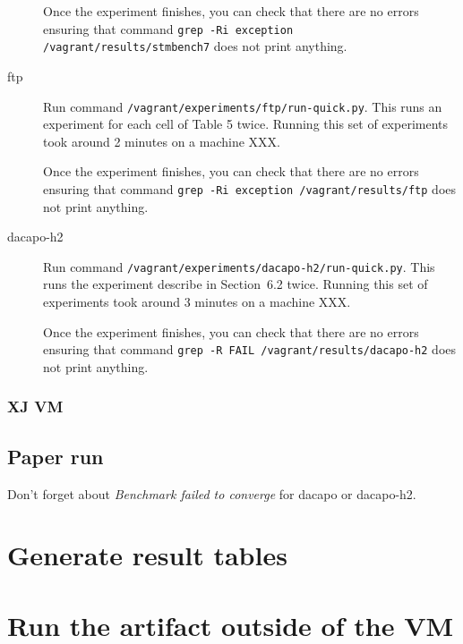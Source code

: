 \documentclass[12pt]{article}
\begin{document}
\begin{description}
        Once the experiment finishes, you can check that there are no errors
        ensuring that command \texttt{grep -Ri exception /vagrant/results/stmbench7}
        does not print anything.

    \item[ftp] Run command
        \texttt{/vagrant/experiments/ftp/run-quick.py}.  This runs an
        experiment for each cell of Table 5 twice.  Running this set of
        experiments took around 2 minutes on a machine XXX.

        Once the experiment finishes, you can check that there are no errors
        ensuring that command \texttt{grep -Ri exception /vagrant/results/ftp}
        does not print anything.

    \item[dacapo-h2] Run command
        \texttt{/vagrant/experiments/dacapo-h2/run-quick.py}.  This runs the
        experiment describe in Section~6.2 twice.  Running this set of
        experiments took around 3 minutes on a machine XXX.

        Once the experiment finishes, you can check that there are no errors
        ensuring that command \texttt{grep -R FAIL /vagrant/results/dacapo-h2}
        does not print anything.

\end{description}

\subsubsection{XJ VM}

\subsection{Paper run}
\label{sec:paper-run}

Don't forget about \emph{Benchmark failed to converge} for dacapo or dacapo-h2.

\section{Generate result tables}
\label{sec:tables}

\section{Run the artifact outside of the VM}
\end{document}
